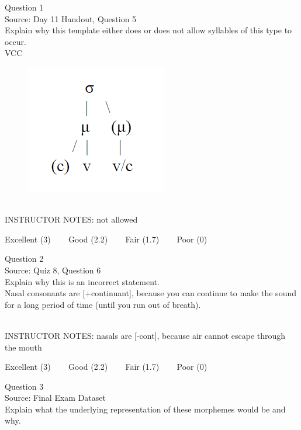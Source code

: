 \documentclass[12pt]{article}
\begin{document}
{\large Question 1}\\

Source: Day 11 Handout, Question 5\\

Explain why this template either does or does not allow syllables of this type to occur.\\

VCC

\begin{figure}[H]
\includegraphics{../images/ponapean_syllabletemplate.png}
\end{figure}

~\\
INSTRUCTOR NOTES: not allowed


\vfill
Excellent (3) ~~~ Good (2.2) ~~~ Fair (1.7) ~~~ Poor (0)
\newpage

{\large Question 2}\\

Source: Quiz 8, Question 6\\

Explain why this is an incorrect statement.\\

Nasal consonants are {[+continuant]}, because you can continue to make the sound for a long period of time (until you run out of breath).


~\\
INSTRUCTOR NOTES: nasals are [-cont], because air cannot escape through the mouth


\vfill
Excellent (3) ~~~ Good (2.2) ~~~ Fair (1.7) ~~~ Poor (0)
\newpage

{\large Question 3}\\

Source: Final Exam Dataset\\

Explain what the underlying representation of these morphemes would be and why.\\
\end{document}
